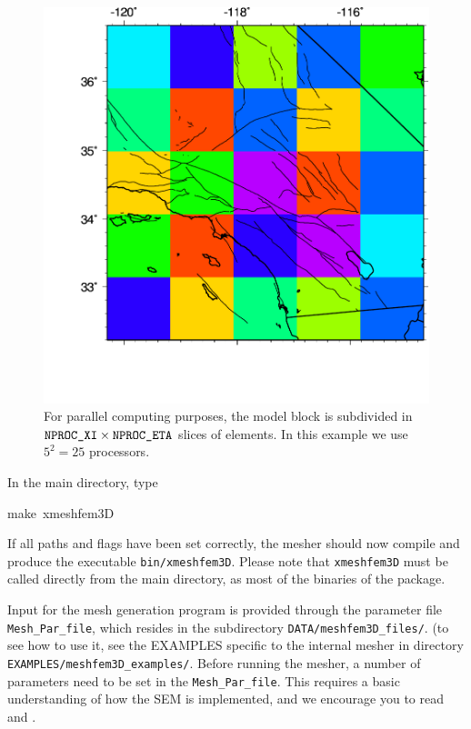 \begin{figure}[htbp]
\noindent \begin{centering}
\includegraphics[scale=0.5]{figures/socal_map_mpi.pdf}
\par\end{centering}

\caption{For parallel computing purposes,
the model block is subdivided in $\mbox{\texttt{NPROC\_XI\/}}\times\mbox{\texttt{NPROC\_ETA\/}}$ slices
of elements. In this example we use $5^{2}=25$ processors. }
\label{fig:For-parallel-computing}
\end{figure}


\noindent
In the main directory, type
\begin{lyxcode}
{\small make~xmeshfem3D}{\small \par}
\end{lyxcode}
If all paths and flags have been set correctly, the mesher should
now compile and produce the executable \texttt{bin/xmeshfem3D}. Please
note that \texttt{xmeshfem3D} must be called directly from the main
directory, as most of the binaries of the package.

Input for the mesh generation program is provided through the parameter
file \texttt{Mesh\_Par\_file}, which resides in the subdirectory \texttt{DATA/meshfem3D\_files/}.
(to see how to use it, see the EXAMPLES specific to the internal mesher in directory \texttt{EXAMPLES/meshfem3D\_examples/}.
Before running the mesher, a number of parameters need to be set in
the \texttt{Mesh\_Par\_file}. This requires a basic understanding
of how the SEM is implemented, and we encourage you to read \citet{KoVi98,KoTr99}
and \citet{KoLiTrSuStSh04}.

